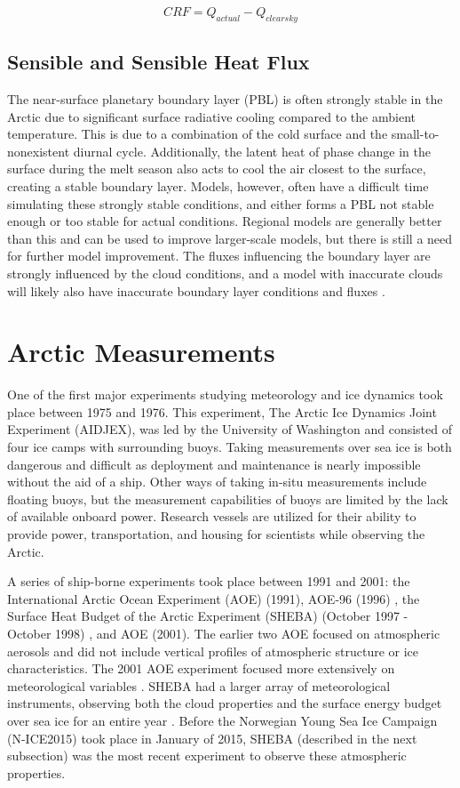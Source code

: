 \begin{equation}\label{eq:crf}
CRF = Q_{actual} - Q_{clear sky}
\end{equation}

\subsection{Sensible and Sensible Heat Flux}

The near-surface planetary boundary layer (PBL) is often strongly stable in the Arctic due to significant surface radiative cooling compared to the ambient temperature. This is due to a combination of the cold surface and the small-to-nonexistent diurnal cycle. Additionally, the latent heat of phase change in the surface during the melt season also acts to cool the air closest to the surface, creating a stable boundary layer. Models, however, often have a difficult time simulating these strongly stable conditions, and either forms a PBL not stable enough or too stable for actual conditions.  Regional models are generally better than this and can be used to improve larger-scale models, but there is still a need for further model improvement. The fluxes influencing the boundary layer are strongly influenced by the cloud conditions, and a model with inaccurate clouds will likely also have inaccurate boundary layer conditions and fluxes \citep{tjernstrom:2005}. 

\section{Arctic Measurements}

One of the first major experiments studying meteorology and ice dynamics took place between 1975 and 1976. This experiment, The Arctic Ice Dynamics Joint Experiment (AIDJEX), was led by the University of Washington and consisted of four ice camps with surrounding buoys. Taking measurements over sea ice is both dangerous and difficult as deployment and maintenance is nearly impossible without the aid of a ship. Other ways of taking in-situ measurements include floating buoys, but the measurement capabilities of buoys are limited by the lack of available onboard power. Research vessels are utilized for their ability to provide power, transportation, and housing for scientists while observing the Arctic.

A series of ship-borne experiments took place between 1991 and 2001: the International Arctic Ocean Experiment (AOE) (1991), AOE-96 (1996) \citep{tjernstrom:2004}, the Surface Heat Budget of the Arctic  Experiment (SHEBA) (October 1997 - October 1998) \citep{uttal:2002}, and AOE (2001). The earlier two AOE focused on atmospheric aerosols and did not include vertical profiles of atmospheric structure or ice characteristics.  The 2001 AOE experiment focused more extensively on meteorological variables \citep{tjernstrom:2004}. SHEBA had a larger array of meteorological instruments, observing both the cloud properties and the surface energy budget over sea ice for an entire year \citep{uttal:2002}. Before the Norwegian Young Sea Ice Campaign (N-ICE2015) took place in January of 2015, SHEBA (described in the next subsection) was the most recent experiment to observe these atmospheric properties. 

